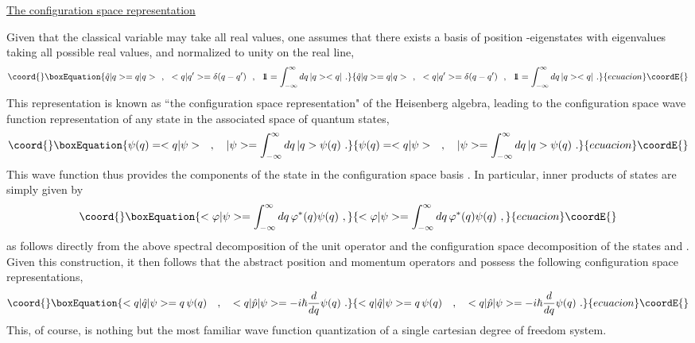 \documentclass[a4paper,11pt]{article}
\def\one{1\hskip -.37em 1}
\begin{document}
\vspace{10pt}

\noindent\underline{The configuration space representation}

\vspace{10pt}

Given that the classical variable \coordHE{} may take all real values, one
assumes that there exists a basis of position \coordHE{}-eigenstates
\coordHE{} with eigenvalues \coordHE{} taking all possible real values, and
normalized to unity on the real line,
\begin{equation}\coord{}\boxEquation{
\hat{q}|q>=q|q>\ \ ,\ \ <q|q'>=\delta(q-q')\ \ ,\ \ 
\one=\int_{-\infty}^\infty dq\,|q><q|\ .
}{
\hat{q}|q>=q|q>\ \ ,\ \ <q|q'>=\delta(q-q')\ \ ,\ \ 
\one=\int_{-\infty}^\infty dq\,|q><q|\ .
}{ecuacion}\coordE{}\end{equation}
This representation is known as ``the configuration space representation" of 
the Heisenberg algebra, leading to the configuration space wave function
re\-pre\-sen\-ta\-tion \myHighlight{$\psi(q)$}\coordHE{} of any state \myHighlight{$|\psi>$}\coordHE{} in the associated 
space of quantum states,
\begin{equation}\coord{}\boxEquation{
\psi(q)=<q|\psi>\ \ \ ,\ \ \ 
|\psi>=\int_{-\infty}^\infty dq\,|q>\psi(q)\ .
}{
\psi(q)=<q|\psi>\ \ \ ,\ \ \ 
|\psi>=\int_{-\infty}^\infty dq\,|q>\psi(q)\ .
}{ecuacion}\coordE{}\end{equation}
This wave function \coordHE{} thus provides the components of the state 
\myHighlight{$|\psi>$}\coordHE{} in the configuration space basis \coordHE{}. In particular, inner 
products of states are simply given by
\begin{equation}\coord{}\boxEquation{
<\varphi|\psi>=\int_{-\infty}^\infty dq\,\varphi^*(q)\psi(q)\ ,
}{
<\varphi|\psi>=\int_{-\infty}^\infty dq\,\varphi^*(q)\psi(q)\ ,
}{ecuacion}\coordE{}\end{equation}
as follows directly from the above spectral decomposition of the unit
ope\-ra\-tor \myHighlight{$\one$}\coordHE{} and the configuration space decomposition of the
states \myHighlight{$|\varphi>$}\coordHE{} and \myHighlight{$|\psi>$}\coordHE{}. Given this construction, it then follows
that the abstract position and momentum operators \coordHE{} and \coordHE{}
possess the following configuration space re\-pre\-sen\-tations,
\begin{equation}\coord{}\boxEquation{
<q|\hat{q}|\psi>=q\,\psi(q)\ \ \ ,\ \ \
<q|\hat{p}|\psi>=-i\hbar\frac{d}{dq}\psi(q)\ .
}{
<q|\hat{q}|\psi>=q\,\psi(q)\ \ \ ,\ \ \
<q|\hat{p}|\psi>=-i\hbar\frac{d}{dq}\psi(q)\ .
}{ecuacion}\coordE{}\end{equation}
This, of course, is nothing but the most familiar wave function quantization
of a single cartesian degree of freedom system.
\end{document}
